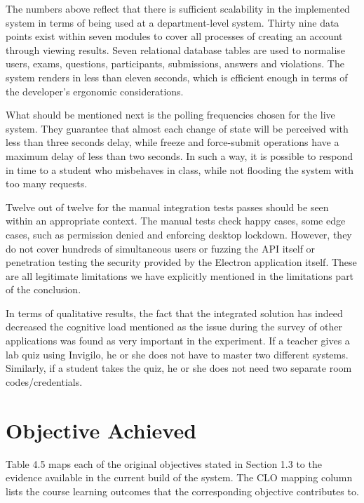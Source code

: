 \documentclass[12pt, a4paper]{report}
\begin{document}
\begin{justify}
  {\fontsize{12}{18}\selectfont
    The numbers above reflect that there is sufficient scalability in the implemented system in terms of being used at a department-level system. Thirty nine data points exist within seven modules to cover all processes of creating an account through viewing results. Seven relational database tables are used to normalise users, exams, questions, participants, submissions, answers and violations. The system renders in less than eleven seconds, which is efficient enough in terms of the developer's ergonomic considerations.

    What should be mentioned next is the polling frequencies chosen for the live system. They guarantee that almost each change of state will be perceived with less than three seconds delay, while freeze and force-submit operations have a maximum delay of less than two seconds. In such a way, it is possible to respond in time to a student who misbehaves in class, while not flooding the system with too many requests.

    Twelve out of twelve for the manual integration tests passes should be seen within an appropriate context. The manual tests check happy cases, some edge cases, such as permission denied and enforcing desktop lockdown. However, they do not cover hundreds of simultaneous users or fuzzing the API itself or penetration testing the security provided by the Electron application itself. These are all legitimate limitations we have explicitly mentioned in the limitations part of the conclusion.

    In terms of qualitative results, the fact that the integrated solution has indeed decreased the cognitive load mentioned as the issue during the survey of other applications was found as very important in the experiment. If a teacher gives a lab quiz using Invigilo, he or she does not have to master two different systems. Similarly, if a student takes the quiz, he or she does not need two separate room codes/credentials.
  }
\end{justify}

\section{Objective Achieved}

\begin{justify}
  {\fontsize{12}{18}\selectfont
    Table 4.5 maps each of the original objectives stated in Section 1.3 to the evidence available in the current build of the system. The CLO mapping column lists the course learning outcomes that the corresponding objective contributes to.
  }
\end{justify}
\end{document}

